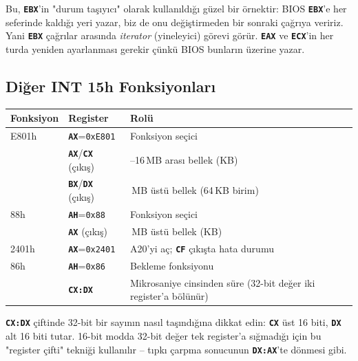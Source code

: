 \documentclass[11pt,a4paper]{article}
\newcommand{\reg}[1]{\texttt{\color{anaMavi}\textbf{#1}}}
\newcommand{\hx}[1]{\texttt{\color{turuncu}#1}}
\begin{document}
\begin{notkutu}
Bu, \reg{EBX}'in "durum taşıyıcı" olarak kullanıldığı güzel bir örnektir:
BIOS \reg{EBX}'e her seferinde kaldığı yeri yazar, biz de onu değiştirmeden
bir sonraki çağrıya veririz. Yani \reg{EBX} çağrılar arasında \emph{iterator}
(yineleyici) görevi görür. \reg{EAX} ve \reg{ECX}'in her turda yeniden
ayarlanması gerekir çünkü BIOS bunların üzerine yazar.
\end{notkutu}

\subsection{Diğer INT 15h Fonksiyonları}

\begin{center}
\begin{tabularx}{\textwidth}{@{}l l >{\raggedright\arraybackslash}X@{}}
\toprule
\rowcolor{anaMavi}\color{white}\textbf{Fonksiyon} & \color{white}\textbf{Register} & \color{white}\textbf{Rolü} \\
\midrule
E801h & \reg{AX}=\hx{0xE801} & Fonksiyon seçici \\
\rowcolor{acikGri} & \reg{AX}/\reg{CX} (çıkış) & 1--16\,MB arası bellek (KB) \\
& \reg{BX}/\reg{DX} (çıkış) & 16\,MB üstü bellek (64\,KB birim) \\
\midrule
88h & \reg{AH}=\hx{0x88} & Fonksiyon seçici \\
\rowcolor{acikGri} & \reg{AX} (çıkış) & 1\,MB üstü bellek (KB) \\
\midrule
2401h & \reg{AX}=\hx{0x2401} & A20'yi aç; \reg{CF} çıkışta hata durumu \\
\midrule
\rowcolor{acikGri} 86h & \reg{AH}=\hx{0x86} & Bekleme fonksiyonu \\
& \reg{CX:DX} & Mikrosaniye cinsinden süre (32-bit değer iki register'a bölünür) \\
\bottomrule
\end{tabularx}
\end{center}

\begin{ipucukutu}
\reg{CX:DX} çiftinde 32-bit bir sayının nasıl taşındığına dikkat edin:
\reg{CX} üst 16 biti, \reg{DX} alt 16 biti tutar. 16-bit modda 32-bit değer
tek register'a sığmadığı için bu "register çifti" tekniği kullanılır --
tıpkı çarpma sonucunun \reg{DX:AX}'te dönmesi gibi.
\end{ipucukutu}
\end{document}
